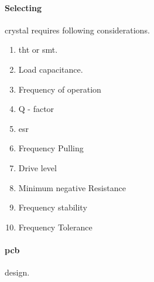 	\paragraph{Selecting} crystal requires following considerations.
		\begin{enumerate}
				\item \gls{tht} or \gls{smt}.
				\item Load capacitance.
				\item Frequency of operation
				\item Q - factor
				\item \gls{esr}
				\item Frequency Pulling
				\item Drive level
				\item Minimum negative Resistance
				\item Frequency stability
				\item Frequency Tolerance
		\end{enumerate}
			
	\paragraph{\gls{pcb} } design.
	

\cite{AVR042}

